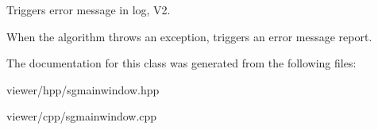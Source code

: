 Triggers error message in log, V2. 

When the algorithm throws an exception, triggers an error message report. 

The documentation for this class was generated from the following files\+:\begin{DoxyCompactItemize}
\item 
viewer/hpp/sgmainwindow.\+hpp\item 
viewer/cpp/sgmainwindow.\+cpp\end{DoxyCompactItemize}
